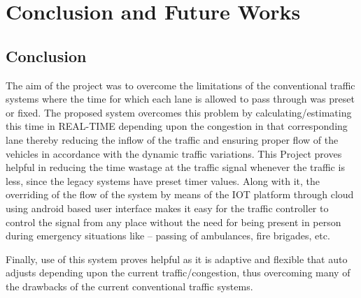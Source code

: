 \chapter{Conclusion and Future Works}

\section{Conclusion}
The aim of the project was to overcome the limitations of the conventional traffic systems where the time for which each lane is allowed to pass through was preset or fixed. The proposed system overcomes this problem by calculating/estimating this time in REAL-TIME depending upon the congestion in that corresponding lane thereby reducing the inflow of the traffic and ensuring proper flow of the vehicles in accordance with the dynamic traffic variations. This Project proves helpful in reducing the time wastage at the traffic signal whenever the traffic is less, since the legacy systems have preset timer values. Along with it, the overriding of the flow of the system by means of the IOT platform through cloud using android based user interface makes it easy for the traffic controller to control the signal from any place without the need for being present in person during emergency situations like – passing of ambulances, fire brigades, etc.

Finally, use of this system proves helpful as it is adaptive and flexible that auto adjusts depending upon the current traffic/congestion, thus overcoming many of the drawbacks of the current conventional traffic systems.

\pagebreak

